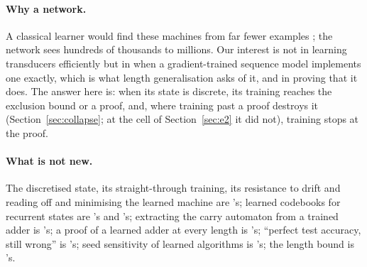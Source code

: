 \documentclass[11pt]{article}
\begin{document}
\paragraph{Why a network.} A classical learner would find these machines from far fewer examples
\citep{oncina-1992-transducer-learning-pattern-recognition}; the network sees hundreds of
thousands to millions.
Our interest is not in learning transducers efficiently but in when a gradient-trained sequence
model implements one exactly, which is what length generalisation asks of it, and in proving that
it does. The answer here is: when its state is discrete, its training reaches the exclusion bound or
a proof, and, where training past a proof destroys it (Section~\ref{sec:collapse}; at the cell of
Section~\ref{sec:e2} it did not), training stops at the proof.

\paragraph{What is not new.} The discretised state, its straight-through training, its resistance to
drift and reading off and minimising the learned machine are \citet{zeng-1993-self-clustering-recurrent-networks}'s;
learned codebooks for recurrent states are \citet{das-1993-unified-gradient-clustering-fsm-induction}'s
and \citet{wang-2019-state-regularized-rnns}'s; extracting the carry automaton from a trained adder
is \citet{oliva-2020-dual-recurrent-memory-processing}'s; a proof of a learned adder at every
length is \citet{lan-2022-minimum-description-length-rnns}'s; ``perfect test accuracy, still wrong''
is \citet{weiss-2018-extracting-automata-queries-counterexamples}'s; seed sensitivity of learned
algorithms is \citet{price-2016-neural-gpu-extensions-limitations}'s; the length bound is
\citet{moore-1956-gedanken-experiments-sequential-machines}'s.
\end{document}
